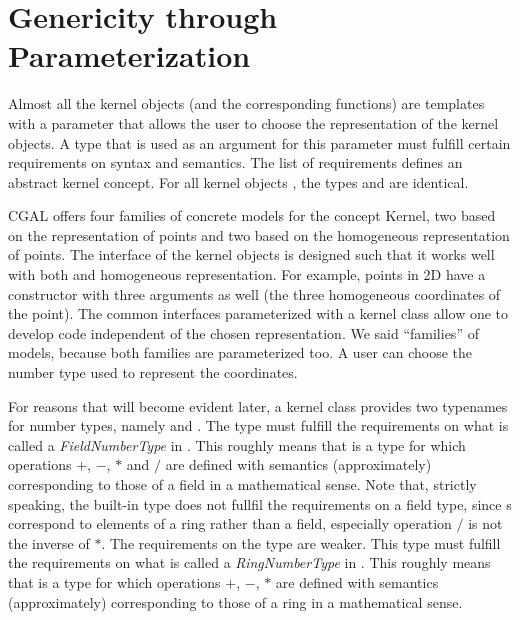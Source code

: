\section{Genericity through Parameterization}

Almost all the kernel objects (and the corresponding functions) are
templates with a parameter that allows the user to choose the
representation of the kernel objects. A type that is used as an
argument for this parameter must fulfill certain requirements on
syntax and semantics. The list of requirements defines an abstract
kernel concept. For all kernel objects
, the types
 and 
 are identical.

CGAL offers four families of concrete models for the concept Kernel,
two based on the  representation of
points and two based on the homogeneous representation of points. The
interface of the kernel objects is designed such that it works well
with both  and homogeneous
representation. For example, points in 2D have a constructor with
three arguments as well (the three homogeneous coordinates of the
point).  The common interfaces parameterized with a kernel class allow
one to develop code independent of the chosen representation.  We said
``families'' of models, because both families are parameterized too.
A user can choose the number type used to represent the coordinates.

For reasons that will become evident later, a kernel class provides
two typenames for number types,
namely  and .%
 The type  must fulfill the
requirements on what is called a {\em FieldNumberType} in \cgal. This
roughly means that  is a type for which operations
$+$, $-$, $*$ and $/$ are defined with semantics (approximately)
corresponding to those of a field in a mathematical sense. Note that,
strictly speaking, the built-in type  does not fullfil the
requirements on a field type, since s correspond to elements
of a ring rather than a field, especially operation $/$ is not the
inverse of $*$.  The requirements on the type  are
weaker.  This type must fulfill the requirements on what is called a
{\em RingNumberType} in \cgal. This roughly means that
 is a type for which operations $+$, $-$, $*$ are
defined with semantics (approximately) corresponding to those of a
ring in a mathematical sense. 

